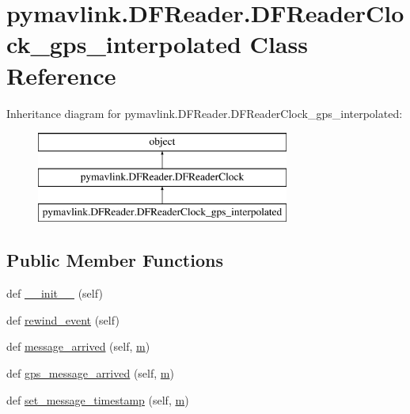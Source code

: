 \hypertarget{classpymavlink_1_1DFReader_1_1DFReaderClock__gps__interpolated}{}\section{pymavlink.\+D\+F\+Reader.\+D\+F\+Reader\+Clock\+\_\+gps\+\_\+interpolated Class Reference}
\label{classpymavlink_1_1DFReader_1_1DFReaderClock__gps__interpolated}
Inheritance diagram for pymavlink.\+D\+F\+Reader.\+D\+F\+Reader\+Clock\+\_\+gps\+\_\+interpolated\+:\begin{figure}[H]
\begin{center}
\leavevmode
\includegraphics[height=3.000000cm]{classpymavlink_1_1DFReader_1_1DFReaderClock__gps__interpolated}
\end{center}
\end{figure}
\subsection*{Public Member Functions}
\begin{DoxyCompactItemize}
\item 
def \mbox{\hyperlink{classpymavlink_1_1DFReader_1_1DFReaderClock__gps__interpolated_a3f055fcf15691808e52dec36a04d2efd}{\+\_\+\+\_\+init\+\_\+\+\_\+}} (self)
\item 
def \mbox{\hyperlink{classpymavlink_1_1DFReader_1_1DFReaderClock__gps__interpolated_a17d0356947948b2bbeb7a47531515c72}{rewind\+\_\+event}} (self)
\item 
def \mbox{\hyperlink{classpymavlink_1_1DFReader_1_1DFReaderClock__gps__interpolated_a299f6e30eda10492ab18a321a09a15fa}{message\+\_\+arrived}} (self, \mbox{\hyperlink{namespacepymavlink_1_1DFReader_a41dcad484f9dfcaca656786d0882f168}{m}})
\item 
def \mbox{\hyperlink{classpymavlink_1_1DFReader_1_1DFReaderClock__gps__interpolated_ab5c7d16117c7dc486fcd820a8558ef13}{gps\+\_\+message\+\_\+arrived}} (self, \mbox{\hyperlink{namespacepymavlink_1_1DFReader_a41dcad484f9dfcaca656786d0882f168}{m}})
\item 
def \mbox{\hyperlink{classpymavlink_1_1DFReader_1_1DFReaderClock__gps__interpolated_aead72c7143461d54d934f541dbc03e41}{set\+\_\+message\+\_\+timestamp}} (self, \mbox{\hyperlink{namespacepymavlink_1_1DFReader_a41dcad484f9dfcaca656786d0882f168}{m}})
\end{DoxyCompactItemize}
